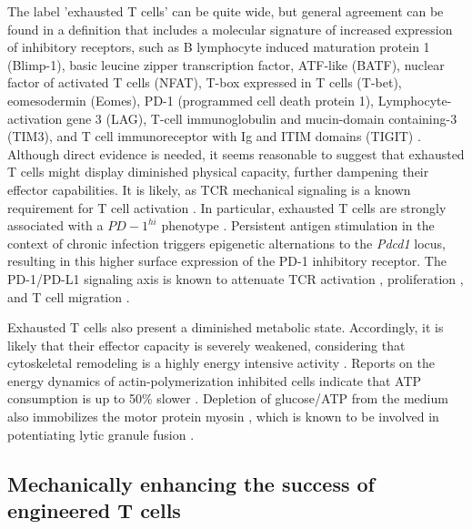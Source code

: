 The label 'exhausted T cells' can be quite wide, but general agreement can be found in a definition that includes a molecular signature of increased expression of inhibitory receptors, such as B lymphocyte induced maturation protein 1 (Blimp-1), basic leucine zipper transcription factor, ATF-like (BATF), nuclear factor of activated T cells (NFAT), T-box expressed in T cells (T-bet), eomesodermin (Eomes), PD-1 (programmed cell death protein 1), Lymphocyte-activation gene 3 (LAG), T-cell immunoglobulin and mucin-domain containing-3 (TIM3), and T cell immunoreceptor with Ig and ITIM domains (TIGIT) \cite{Wherry2011, Quigley2010, Keir2008, Doering2012, Wherry2007, Wang2012,  Lazarevic2013, Rangachari2012, Shin2009, Paley2012, Larsson2013}. Although direct evidence is needed, it seems reasonable to suggest that exhausted T cells might display diminished physical capacity, further dampening their effector capabilities. It is likely, as TCR mechanical signaling is a known requirement for T cell activation \cite{Hu2016}. In particular, exhausted T cells are strongly associated with a $PD-1^{hi}$ phenotype \cite{Keir2008}. Persistent antigen stimulation in the context of chronic infection triggers epigenetic alternations to the \textit{Pdcd1} locus, resulting in this higher surface expression of the PD-1 inhibitory receptor. The PD-1/PD-L1 signaling axis is known to attenuate TCR activation \cite{Mizuno2019}, proliferation \cite{Schietinger2014}, and T cell migration \cite{Zinselmeyer2013}. 

Exhausted T cells also present a diminished metabolic state. Accordingly, it is likely that their effector capacity is severely weakened, considering that cytoskeletal remodeling is a highly energy intensive activity \cite{Bernstein2002}. Reports on the energy dynamics of actin-polymerization inhibited cells indicate that ATP consumption is up to 50\% slower \cite{Bernstein2002, Ahmed2015}. Depletion of glucose/ATP from the medium also immobilizes the motor protein myosin \cite{Xu2014}, which is known to be involved in potentiating lytic granule fusion \cite{Basu2016}.

\subsection{Mechanically enhancing the success of engineered T cells}

